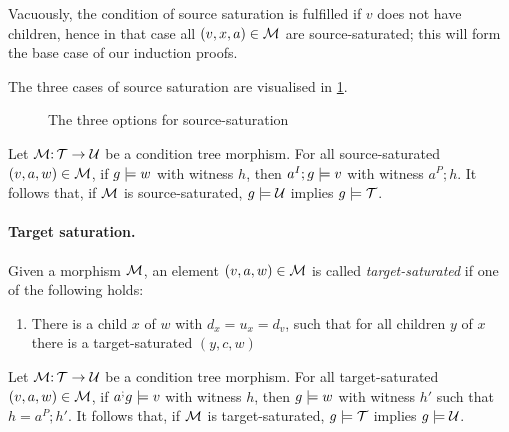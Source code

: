 Vacuously, the condition of source saturation is fulfilled if $v$ does not have children, hence in that case all $(v,x,a)\in {\mathcal{M}}$ are source-saturated; this will form the base case of our induction proofs.

The three cases of source saturation are visualised in \cref{fig:source-saturation}.

\begin{figure}

\caption{The three options for source-saturation}
\label{fig:source-saturation}
\end{figure}

\begin{lemma}\label{lem:source-saturation}
Let ${\mathcal{M}}{:}\,{\mathcal{T}}\rightarrow{\mathcal{U}}$ be a condition tree morphism. For all source-saturated $(v,a,w)\in {\mathcal{M}}$, if $g\models w$ with witness $h$, then $a^I;g\models v$ with witness $a^P;h$. It follows that, if ${\mathcal{M}}$ is source-saturated, $g\models{\mathcal{U}}$ implies $g\models{\mathcal{T}}$.
\end{lemma}

\paragraph{Target saturation.}

Given a morphism ${\mathcal{M}}$, an element $(v,a,w)\in {\mathcal{M}}$ is called \emph{target-saturated} if one of the following holds:

\begin{enumerate}[label=(\alph*)]
\item There is a child $x$ of $w$ with $d_x=u_x=d_v$, such that for all children $y$ of $x$ there is a target-saturated $(y,c,w)$
\end{enumerate}

\begin{lemma}
Let ${\mathcal{M}}{:}\,{\mathcal{T}}\rightarrow{\mathcal{U}}$ be a condition tree morphism. For all target-saturated $(v,a,w)\in {\mathcal{M}}$, if $a^;g\models v$ with witness $h$, then $g\models w$ with witness $h'$ such that $h=a^P;h'$. It follows that, if ${\mathcal{M}}$ is target-saturated, $g\models{\mathcal{T}}$ implies $g\models{\mathcal{U}}$.
\end{lemma}

